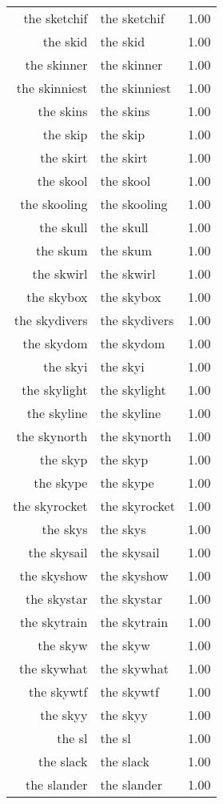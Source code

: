 \begin{table}[ht]
\begin{tabular}{rlr}
  the sketchif & the sketchif & 1.00 \\ 
  the skid & the skid & 1.00 \\ 
  the skinner & the skinner & 1.00 \\ 
  the skinniest & the skinniest & 1.00 \\ 
  the skins & the skins & 1.00 \\ 
  the skip & the skip & 1.00 \\ 
  the skirt & the skirt & 1.00 \\ 
  the skool & the skool & 1.00 \\ 
  the skooling & the skooling & 1.00 \\ 
  the skull & the skull & 1.00 \\ 
  the skum & the skum & 1.00 \\ 
  the skwirl & the skwirl & 1.00 \\ 
  the skybox & the skybox & 1.00 \\ 
  the skydivers & the skydivers & 1.00 \\ 
  the skydom & the skydom & 1.00 \\ 
  the skyi & the skyi & 1.00 \\ 
  the skylight & the skylight & 1.00 \\ 
  the skyline & the skyline & 1.00 \\ 
  the skynorth & the skynorth & 1.00 \\ 
  the skyp & the skyp & 1.00 \\ 
  the skype & the skype & 1.00 \\ 
  the skyrocket & the skyrocket & 1.00 \\ 
  the skys & the skys & 1.00 \\ 
  the skysail & the skysail & 1.00 \\ 
  the skyshow & the skyshow & 1.00 \\ 
  the skystar & the skystar & 1.00 \\ 
  the skytrain & the skytrain & 1.00 \\ 
  the skyw & the skyw & 1.00 \\ 
  the skywhat & the skywhat & 1.00 \\ 
  the skywtf & the skywtf & 1.00 \\ 
  the skyy & the skyy & 1.00 \\ 
  the sl & the sl & 1.00 \\ 
  the slack & the slack & 1.00 \\ 
  the slander & the slander & 1.00 \\ 

\end{tabular}
\end{table}
